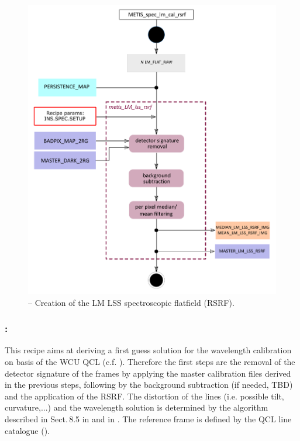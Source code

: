 \begin{figure}[ht]
  \centering
  \includegraphics[width=0.5\textheight]{figures/metis_lm_lss_rsrf_v0.65.pdf}
  \caption[Recipe: ]{ --
    Creation of the LM LSS spectroscopic flatfield (\ac{RSRF}).}
  \label{Fig:rec_lm_lss_rsrf}
\end{figure}
\clearpage

\subsubsection{:}
This recipe aims at deriving a first guess solution for the wavelength calibration on basis of the \ac{WCU} \ac{QCL} (c.f. \cite{METIS-calibration_plan}). Therefore the first steps are the removal of the detector signature of the  frames by applying the master calibration files derived in the previous steps, following by the background subtraction (if needed, TBD) and the application of the RSRF. The distortion of the lines (i.e. possible tilt, curvature,...) and the wavelength solution is determined by the algorithm described in Sect.\,8.5 in \cite{DRLS} and in \cite{METIS-calibration_plan}. The reference frame is defined by the \ac{QCL} line catalogue ().

